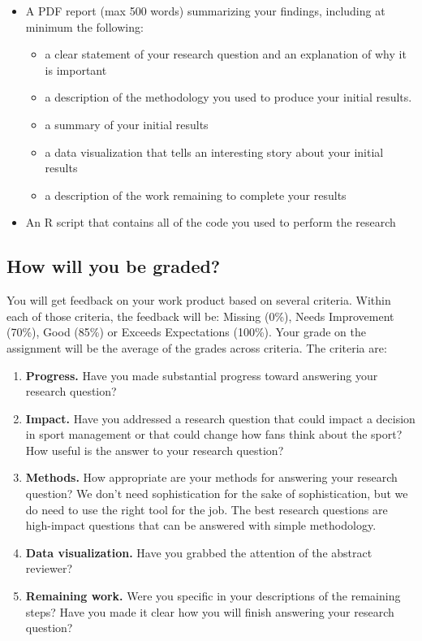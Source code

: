 \documentclass{article}
\begin{document}
        \begin{itemize}
          \item A PDF report (max 500 words) summarizing your findings, including at minimum the following:
          \begin{itemize}
            \item a clear statement of your research question and an explanation of why it is important
            \item a description of the methodology you used to produce your initial results.
            \item a summary of your initial results
            \item a data visualization that tells an interesting story about your initial results
            \item a description of the work remaining to complete your results
          \end{itemize}
          \item An R script that contains all of the code you used to perform the research
        \end{itemize}

    \subsection*{\sc How will you be graded?}

      You will get feedback on your work product based on several criteria. Within each of those criteria, the feedback will be: Missing (0\%), Needs Improvement (70\%), Good (85\%) or Exceeds Expectations (100\%). Your grade on the assignment will be the average of the grades across criteria. The criteria are:
      \begin{enumerate}
        \item {\bf Progress.} Have you made substantial progress toward answering your research question?
        \item {\bf Impact.} Have you addressed a research question that could impact a decision in sport management or that could change how fans think about the sport? How useful is the answer to your research question?
        \item {\bf Methods.} How appropriate are your methods for answering your research question? We don't need sophistication for the sake of sophistication, but we do need to use the right tool for the job. The best research questions are high-impact questions that can be answered with simple methodology.
        \item {\bf Data visualization.} Have you grabbed the attention of the abstract reviewer?
        \item {\bf Remaining work.} Were you specific in your descriptions of the remaining steps? Have you made it clear how you will finish answering your research question?
      \end{enumerate}
  
\end{document}
